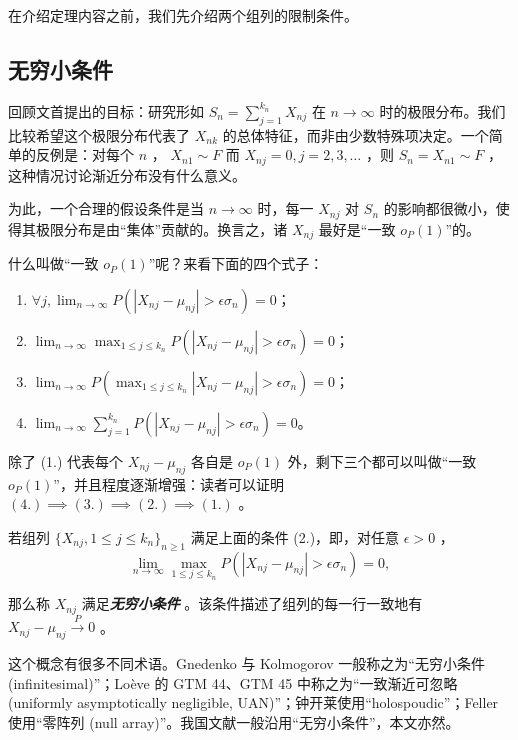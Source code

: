在介绍定理内容之前，我们先介绍两个组列的限制条件。

\subsection{无穷小条件}

回顾文首提出的目标：研究形如 $S_n=\sum\limits_{j=1}^{k_n}X_{nj}$ 在 $n\to\infty$ 时的极限分布。我们比较希望这个极限分布代表了 $X_{nk}$ 的总体特征，而非由少数特殊项决定。一个简单的反例是：对每个 $n$ ， $X_{n1}\sim F$ 而 $X_{nj}=0,j=2,3,\dots$ ，则 $S_n=X_{n1}\sim F$ ，这种情况讨论渐近分布没有什么意义。

为此，一个合理的假设条件是当 $n\to\infty$ 时，每一 $X_{nj}$ 对 $S_n$ 的影响都很微小，使得其极限分布是由``集体''贡献的。换言之，诸 $X_{nj}$ 最好是``一致 $o_P(1)$''的。

什么叫做``一致 $o_P(1)$''呢？来看下面的四个式子：

\begin{enumerate}
\def\labelenumi{\arabic{enumi}.}
\tightlist
\item
  $\displaystyle \forall j, \lim_{n \to \infty} P(|X_{nj} - \mu_{nj}| > \epsilon \sigma_n) = 0$；
\item
  $\displaystyle \lim_{n \to \infty} \max_{1 \leq j \leq k_n} P(|X_{nj} - \mu_{nj}| > \epsilon \sigma_n) = 0$；
\item
  $\displaystyle \lim_{n \to \infty} P\left(\max_{1 \leq j \leq k_n} |X_{nj} - \mu_{nj}| > \epsilon \sigma_n\right) = 0$；
\item
  $\displaystyle \lim_{n \to \infty} \sum_{j=1}^{k_n} P(|X_{nj} - \mu_{nj}| > \epsilon \sigma_n) = 0$。
\end{enumerate}

除了 (1.) 代表每个 $X_{nj}-\mu_{nj}$ 各自是 $o_P(1)$ 外，剩下三个都可以叫做``一致 $o_P(1)$''，并且程度逐渐增强：读者可以证明 $(4.)\implies (3.)\implies (2.)\implies (1.)$ 。

\begin{definition*}[无穷小条件]

若组列 $\{X_{nj},1\le j\le k_n\}_{n\ge 1}$ 满足上面的条件 (2.)，即，对任意 $\epsilon>0$ ，
\[
\lim_{n \to \infty} \max_{1 \leq j \leq k_n} P(|X_{nj} - \mu_{nj}| > \epsilon \sigma_n) = 0,
\]

那么称 $X_{nj}$ 满足\textbf{\emph{无穷小条件}} 。该条件描述了组列的每一行一致地有 $X_{nj}-\mu_{nj}\overset{P}\to 0$ 。

\end{definition*}

\begin{remark}
这个概念有很多不同术语。Gnedenko 与 Kolmogorov 一般称之为``无穷小条件 (infinitesimal)''；Loève 的 GTM 44、GTM 45 中称之为``一致渐近可忽略 (uniformly asymptotically negligible, UAN)''；钟开莱使用``holospoudic''；Feller 使用``零阵列 (null array)''。我国文献一般沿用``无穷小条件''，本文亦然。
\end{remark}

